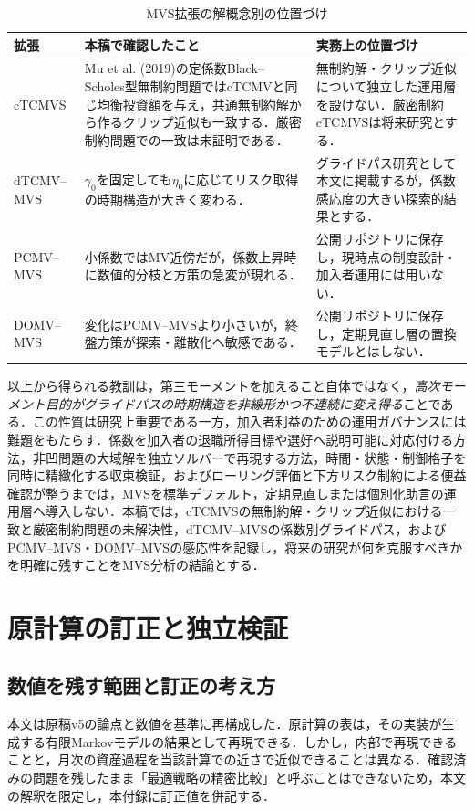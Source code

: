\documentclass[10pt,a4paper]{article}
\theoremstyle{plain}
\theoremstyle{definition}
\begin{document}
\begin{table}[htbp]
\centering\small
\caption{MVS拡張の解概念別の位置づけ}
\label{tab:mvs-positioning}
\begin{tabularx}{\textwidth}{p{25mm}p{48mm}X}
\toprule
拡張 & 本稿で確認したこと & 実務上の位置づけ \\
\midrule
cTCMVS
& Mu et al. (2019)の定係数Black--Scholes型無制約問題ではcTCMVと同じ均衡投資額を与え，共通無制約解から作るクリップ近似も一致する．厳密制約問題での一致は未証明である．
& 無制約解・クリップ近似について独立した運用層を設けない．厳密制約cTCMVSは将来研究とする．\\
dTCMV--MVS
& $\gamma_0$を固定しても$\eta_0$に応じてリスク取得の時期構造が大きく変わる．
& グライドパス研究として本文に掲載するが，係数感応度の大きい探索的結果とする．\\
PCMV--MVS
& 小係数ではMV近傍だが，係数上昇時に数値的分枝と方策の急変が現れる．
& 公開リポジトリに保存し，現時点の制度設計・加入者運用には用いない．\\
DOMV--MVS
& 変化はPCMV--MVSより小さいが，終盤方策が探索・離散化へ敏感である．
& 公開リポジトリに保存し，定期見直し層の置換モデルとはしない．\\
\bottomrule
\end{tabularx}
\end{table}

以上から得られる教訓は，第三モーメントを加えること自体ではなく，\emph{高次モーメント目的がグライドパスの時期構造を非線形かつ不連続に変え得る}ことである．この性質は研究上重要である一方，加入者利益のための運用ガバナンスには難題をもたらす．係数を加入者の退職所得目標や選好へ説明可能に対応付ける方法，非凹問題の大域解を独立ソルバーで再現する方法，時間・状態・制御格子を同時に精緻化する収束検証，およびローリング評価と下方リスク制約による便益確認が整うまでは，MVSを標準デフォルト，定期見直しまたは個別化助言の運用層へ導入しない．本稿では，cTCMVSの無制約解・クリップ近似における一致と厳密制約問題の未解決性，dTCMV--MVSの係数別グライドパス，およびPCMV--MVS・DOMV--MVSの感応性を記録し，将来の研究が何を克服すべきかを明確に残すことをMVS分析の結論とする．

\section{原計算の訂正と独立検証}\label{app:corrections}
\subsection{数値を残す範囲と訂正の考え方}
本文は原稿v5の論点と数値を基準に再構成した．原計算の表は，その実装が生成する有限Markovモデルの結果として再現できる．しかし，内部で再現できることと，月次の資産過程を当該計算での近さで近似できることは異なる．確認済みの問題を残したまま「最適戦略の精密比較」と呼ぶことはできないため，本文の解釈を限定し，本付録に訂正値を併記する．
\end{document}
